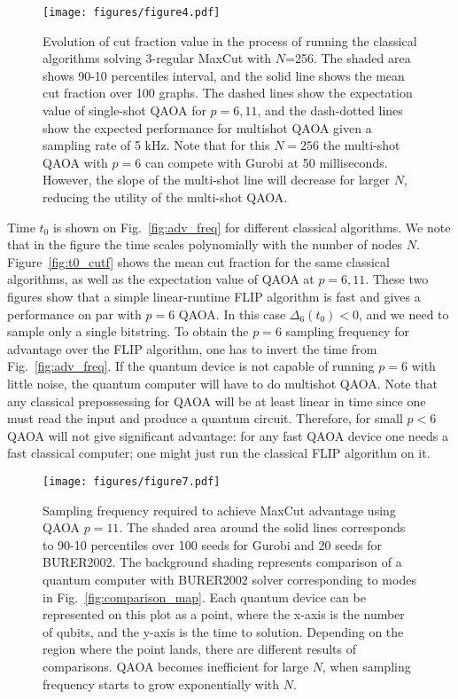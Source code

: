 \begin{figure}
    \centering
    \texttt{[image: figures/figure4.pdf]}
    \caption{
    Evolution of cut fraction value in the process of running the classical algorithms solving 3-regular MaxCut with $N$=256. The shaded area shows 90-10 percentiles interval, 
    and the solid line shows the mean cut fraction over 100 graphs.
    The dashed lines show the expectation value of single-shot QAOA for $p=6, 11$, and
    the dash-dotted lines show the expected performance for multishot QAOA given a sampling rate of 5 kHz.
    Note that for this $N=256$ the multi-shot QAOA with $p=6$ can compete with Gurobi
    at 50 milliseconds. However, the slope of the multi-shot line will decrease for larger $N$, reducing the utility of the multi-shot QAOA. 
    }
    \label{fig:timebounds}
\end{figure}

Time $t_0$ is shown on Fig.~\ref{fig:adv_freq} for different classical algorithms. We note that in the figure
the time scales polynomially with the number of nodes $N$. Figure~\ref{fig:t0_cutf} shows the mean cut fraction for the same classical algorithms, as well as the expectation value of QAOA at $p=6, 11$. These two figures show that a simple linear-runtime FLIP algorithm is fast and gives a performance on par with $p=6$ QAOA. In this case $\Delta_6(t_0) < 0$, and we  need to sample only a single bitstring. To obtain the $p=6$ sampling frequency for advantage over the FLIP algorithm, one has to invert the time from Fig.~\ref{fig:adv_freq}. If the quantum device is not capable of running $p=6$ with little noise, the quantum computer will have to do multishot QAOA. Note that any classical prepossessing for QAOA will be at least linear in time since one must read the input and produce a quantum circuit. Therefore, for small $p<6$ QAOA will not give significant advantage: for any fast QAOA device one needs a fast classical computer; one might just run the classical FLIP algorithm on it.

\begin{figure}
    \centering
    \texttt{[image: figures/figure7.pdf]}
    \caption{
    Sampling frequency required to achieve MaxCut advantage using QAOA $p=11$.
    The shaded area around the solid lines corresponds to 90-10 percentiles over 100 seeds for Gurobi and 20 seeds for BURER2002.
    The background shading represents comparison of a quantum computer with BURER2002 solver corresponding to modes in Fig.~\ref{fig:comparison_map}.
    Each quantum device can be represented on this plot as a point, where the x-axis is the number of qubits, and the y-axis is the time to solution. 
    Depending on the region where the point lands, there are different results of comparisons.
    QAOA becomes inefficient for large $N$, when sampling frequency starts to grow exponentially with $N$.
    }
    \label{fig:adv_rate}
\end{figure}

